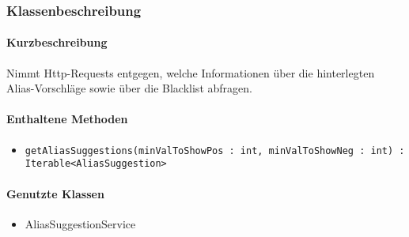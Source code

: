 \subsubsection*{Klassenbeschreibung}%
\paragraph*{Kurzbeschreibung}
Nimmt Http-Requests entgegen, welche Informationen über die hinterlegten Alias-Vorschläge sowie über die Blacklist abfragen.
\paragraph*{Enthaltene Methoden}
\begin{itemize}
    \item \texttt{getAliasSuggestions(minValToShowPos : int, minValToShowNeg : int) : Iterable<AliasSuggestion>}
\end{itemize}
\paragraph*{Genutzte Klassen}
\begin{itemize}
    \item AliasSuggestionService
\end{itemize}
